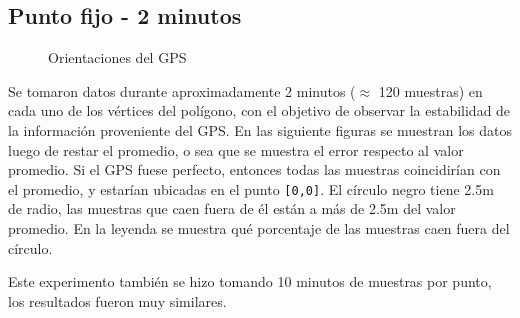 \documentclass[main]{subfiles}
\begin{document}
\subsection{Punto fijo - 2 minutos}
\label{sec:gps2-punto-fijo-2-minutos}

\begin{figure}
\vspace{-30pt}
  \centering
\caption{Orientaciones del GPS}
\vspace{-10pt}
\end{figure}

Se tomaron datos durante aproximadamente 2 minutos ($\approx$ 120 muestras) en cada uno de los vértices del polígono, con el objetivo de observar la estabilidad de la información proveniente del GPS. En las siguiente figuras se muestran los datos luego de restar el promedio, o sea que se muestra el error respecto al valor promedio. Si el GPS fuese perfecto, entonces todas las muestras coincidirían con el promedio, y estarían ubicadas en el punto \verb+[0,0]+. El círculo negro tiene 2.5m de radio, las muestras que caen fuera de él están a más de 2.5m del valor promedio. En la leyenda se muestra qué porcentaje de las muestras caen fuera del círculo.

Este experimento también se hizo tomando 10 minutos de muestras por punto, los resultados fueron muy similares.
\end{document}
